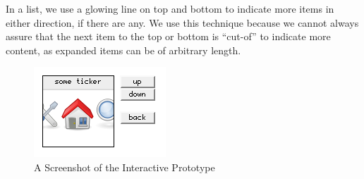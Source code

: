 \begin{description}
    In a list, we use a glowing line on top and bottom to indicate more 
    items in either direction, if there are any. We use this technique 
    because we cannot always assure that the next item to the top or 
    bottom is ``cut-of'' to indicate more content, as expanded items can
    be of arbitrary length.
\begin{figure}[h]
  \begin{center}
    \includegraphics[width=0.6\linewidth]{imgs/screen.png}
  \end{center}
  \caption{A Screenshot of the Interactive Prototype}
  \label{fig:prototype}
\end{figure}
\end{description}
